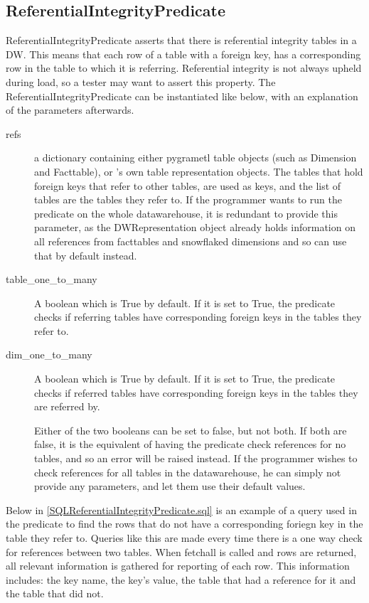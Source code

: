 \subsection{ReferentialIntegrityPredicate}
ReferentialIntegrityPredicate asserts that there is referential integrity tables in a DW. This means that each row of a table with a foreign key, has a corresponding row in the table to which it is referring. Referential integrity is not always upheld during load, so a tester may want to assert this property. The ReferentialIntegrityPredicate can be instantiated like below, with an explanation of the parameters afterwards.


\begin{description}
\item [refs] a dictionary containing either pygrametl table objects (such as Dimension and Facttable), or \FW{}'s own table representation objects. The tables that hold foreign keys that refer to other tables, are used as keys, and the list of tables are the tables they refer to. If the programmer wants to run the predicate on the whole datawarehouse, it is redundant to provide this parameter, as the DWRepresentation object already holds information on all references from facttables and snowflaked dimensions and so can use that by default instead.
\item [table\_one\_to\_many] A boolean which is True by default. If it is set to True, the predicate checks if referring tables have corresponding foreign keys in the tables they refer to.
\item [dim\_one\_to\_many] A boolean which is True by default. If it is set to True, the predicate checks if referred tables have corresponding foreign keys in the tables they are referred by.

Either of the two booleans can be set to false, but not both. If both are false, it is the equivalent of having the predicate check references for no tables, and so an error will be raised instead. If the programmer wishes to check references for all tables in the datawarehouse, he can simply not provide any parameters, and let them use their default values.
\end{description}

Below in \cref{SQLReferentialIntegrityPredicate.sql} is an example of a query used in the predicate to find the rows that do not have a corresponding foriegn key in the table they refer to. Queries like this are made every time there is a one way check for references between two tables. When fetchall is called and rows are returned, all relevant information is gathered for reporting of each row. This information includes: the key name, the key's value, the table that had a reference for it and the table that did not.


